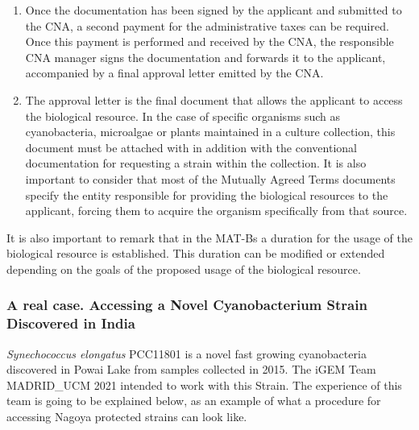 \begin{enumerate}
\item Once the documentation has been signed by the applicant and submitted to the CNA, a second payment for the administrative taxes can be required. Once this payment is performed and received by the CNA, the responsible  CNA manager signs the documentation and forwards it to the applicant, accompanied by a final approval letter emitted by the CNA.
\item The approval letter is the final document that allows the applicant to access the biological resource. In the case of specific organisms such as cyanobacteria, microalgae or plants maintained in a culture collection, this document must be attached with in addition with the conventional documentation for requesting a strain within the collection.  It is also important to consider that most of the Mutually Agreed Terms documents specify the entity responsible for providing the biological resources to the applicant, forcing them to acquire the organism specifically from that source. 
\end{enumerate}
It is also important to remark that in the MAT-Bs a duration for the usage of the biological resource is established. This duration can be modified or extended depending on the goals of the proposed usage of the biological resource. 


\subsubsection{A real case. Accessing a Novel Cyanobacterium Strain Discovered in India}
\textit{Synechococcus elongatus} PCC11801 is a novel fast growing cyanobacteria discovered in Powai Lake from samples collected in 2015. The iGEM Team MADRID\_UCM 2021 intended to work with this Strain. The experience of this team is going to be explained below, as an example of what a procedure for accessing Nagoya protected strains can look like. 

